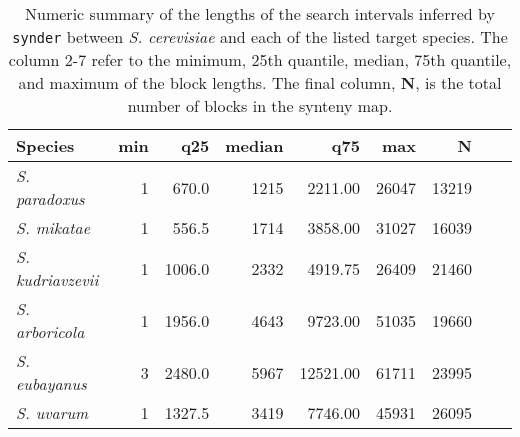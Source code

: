 \begin{table}[!h]
  \centering
  \caption{Numeric summary of the lengths of the search intervals inferred by
  {\tt synder} between \textit{S. cerevisiae} and each of the listed target
  species.  The column 2-7 refer to the minimum, 25th quantile, median, 75th
  quantile, and maximum of the block lengths. The final column, \textbf{N}, is
  the total number of blocks in the synteny map.}
  \label{tab:synder-summary}
  \begin{tabular}{lrrrrrrrr}
    Species                   & min & q25    & median &    q75   &   max &     N \\
    \hline
    \textit{S. paradoxus}     &   1 &  670.0 &   1215 &  2211.00 & 26047 & 13219 \\
    \textit{S. mikatae}       &   1 &  556.5 &   1714 &  3858.00 & 31027 & 16039 \\
    \textit{S. kudriavzevii}  &   1 & 1006.0 &   2332 &  4919.75 & 26409 & 21460 \\
    \textit{S. arboricola}    &   1 & 1956.0 &   4643 &  9723.00 & 51035 & 19660 \\
    \textit{S. eubayanus}     &   3 & 2480.0 &   5967 & 12521.00 & 61711 & 23995 \\
    \textit{S. uvarum}        &   1 & 1327.5 &   3419 &  7746.00 & 45931 & 26095
  \end{tabular}
\end{table}

